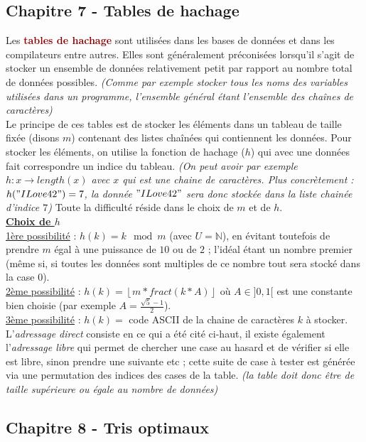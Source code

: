 \documentclass{article}
\newcommand{\dred}[1]{\textcolor{darkred}{\textbf{#1}}}
\newcommand{\cdil}[1]{\left\lfloor #1 \right\rfloor}
\newcommand{\stitre}[1]{\noindent\textbf{\underline{#1}} \\}
\newcommand{\N}{\mathbb{N}}
\begin{document}
\subsection{Chapitre 7 - Tables de hachage}

Les \dred{tables de hachage} sont utilisées dans les bases de données et dans les compilateurs entre autres. 
Elles sont généralement préconisées lorsqu'il s'agit de stocker un ensemble de données relativement petit par 
rapport au nombre total de données possibles. \textit{(Comme par exemple stocker tous les noms des variables 
utilisées dans un programme, l'ensemble général étant l'ensemble des chaînes de caractères)} \\
Le principe de ces tables est de stocker les éléments dans un tableau de taille fixée (disons $m$) contenant des 
listes chaînées qui contiennent les données. Pour stocker les éléments, on utilise la fonction de hachage ($h$) 
qui avec une données fait correspondre un indice du tableau. \textit{(On peut avoir par exemple $h : x 
\rightarrow length(x)$ avec $x$ qui est une chaine de caractères. Plus concrètement : $h("ILove42") = 7$, la 
donnée $"ILove42"$ sera donc stockée dans la liste chainée d'indice $7$)} Toute la difficulté réside dans le 
choix de $m$ et de $h$.\\

\stitre{Choix de $h$}

\noindent\underline{1ère possibilité} : $h(k) = k \mod m$ (avec $U=\N$), en évitant toutefois de prendre $m$ égal 
à une puissance de $10$ ou de $2$ ; l'idéal étant un nombre premier (même si, si toutes les données sont 
multiples de ce nombre tout sera stocké dans la case 0).\\
\underline{2ème possibilité} : $h(k) = \cdil{m * fract(k*A)}$ où $A\in]0,1[$ est une constante bien choisie (par 
exemple $A = \frac{\sqrt{5}-1}{2}$).\\
\underline{3ème possibilité} : $h(k) =$ code ASCII de la chaine de caractères $k$ à stocker.\\

\noindent L'\textit{adressage direct} consiste en ce qui a été cité ci-haut, il existe également 
l'\textit{adressage libre} qui permet de chercher une case au hasard et de vérifier si elle est libre, sinon 
prendre une suivante etc ; cette suite de case à tester est générée via une permutation des indices des cases de 
la table. \textit{(la table doit donc être de taille supérieure ou égale au nombre de données)}

\subsection{Chapitre 8 - Tris optimaux}
\end{document}
